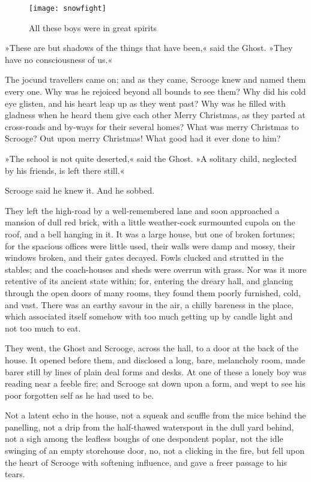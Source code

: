 \begin{figure}[tbh]
\centering
\texttt{[image: snowfight]}
\caption{All these boys were in great spirits}
\end{figure}

»These are but shadows of the things that have been,« said the Ghost. »They have no consciousness of us.«

The jocund travellers came on; and as they came, Scrooge knew and named them every one. Why was he rejoiced beyond all  bounds to see them? Why did his cold eye glisten, and his heart leap up as they went past? Why was he filled with gladness when he heard them give each other Merry Christmas, as they parted at cross-roads and by-ways for their several homes? What was merry Christmas to Scrooge? Out upon merry Christmas! What good had it ever done to him?

»The school is not quite deserted,« said the Ghost. »A solitary child, neglected by his friends, is left there still.«

Scrooge said he knew it. And he sobbed.

They left the high-road by a well-remembered lane and soon approached a mansion of dull red brick, with a little weather-cock surmounted cupola on the roof, and a bell hanging in it. It was a large house, but one of broken fortunes; for the spacious offices were little used, their walls were damp and mossy, their windows broken, and their gates decayed. Fowls clucked and strutted in the stables; and the coach-houses and sheds were overrun with grass. Nor was it more retentive of its ancient state within; for, entering the dreary hall, and glancing through the open doors of many rooms, they found them poorly furnished, cold, and vast. There was an earthy savour in the air, a chilly bareness in the place, which associated itself somehow with too much getting up by candle light and not too much to eat.

They went, the Ghost and Scrooge, across the hall, to a door at the back of the house. It opened before them, and disclosed a long, bare, melancholy room, made barer still by lines of plain deal forms and desks. At one of these a lonely boy was reading near a feeble fire; and Scrooge sat down upon a form, and wept to see his poor forgotten self as he had used to be.

Not a latent echo in the house, not a squeak and scuffle from the mice behind the panelling, not a drip from the half-thawed waterspout in the dull yard behind, not a sigh among the leafless boughs of one despondent poplar, not the idle swinging of an empty storehouse door, no, not a clicking in the fire, but fell upon the heart of Scrooge with softening influence, and gave a freer passage to his tears.


